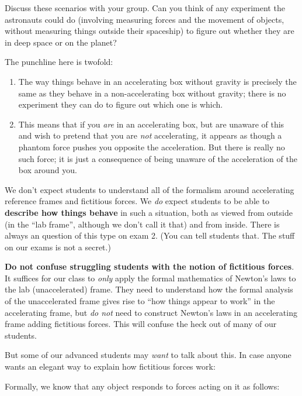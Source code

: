 \documentclass[12pt]{article}
\begin{document}
Discuss these scenarios with your group. Can you think of any experiment the astronauts could do (involving measuring forces and the movement of objects, without measuring things outside their spaceship) to figure out whether they are in deep space or on the planet?

{\color{Red}The punchline here is twofold:
	
	\begin{enumerate}
		\item The way things behave in an accelerating box without gravity is precisely the same as they behave in a non-accelerating box without gravity; there is no experiment they can do to figure out which one is which.
		
		\item This means that if you {\it are} in an accelerating box, but are unaware of this and wish to pretend that you are {\it not} accelerating, it appears as though a phantom force pushes you opposite the acceleration. But there is really no such force; it is just a consequence of being unaware of the acceleration of the box around you.
		
	\end{enumerate}

We don't expect students to understand all of the formalism around accelerating reference frames and fictitious forces. We {\it do} expect students to be able to {\bf describe how things behave} in such a situation, both as viewed from outside (in the ``lab frame'', although we don't call it that) and from inside. There is always an question of this type on exam 2. (You can tell students that. The stuff on our exams is not a secret.) 

{\bf Do not confuse struggling students with the notion of fictitious forces}. It suffices for our class to {\it only} apply the formal mathematics of Newton's laws to the lab (unaccelerated) frame. They need to understand how the formal analysis of the unaccelerated frame gives rise to ``how things appear to work'' in the accelerating frame, but {\it do not} need to construct Newton's laws in an accelerating frame adding fictitious forces. This will confuse the heck out of many of our students.

But some of our advanced students may {\it want} to talk about this. In case anyone wants an elegant way to explain how fictitious forces work:

Formally, we know that any object responds to forces acting on it as follows:

}
\end{document}
